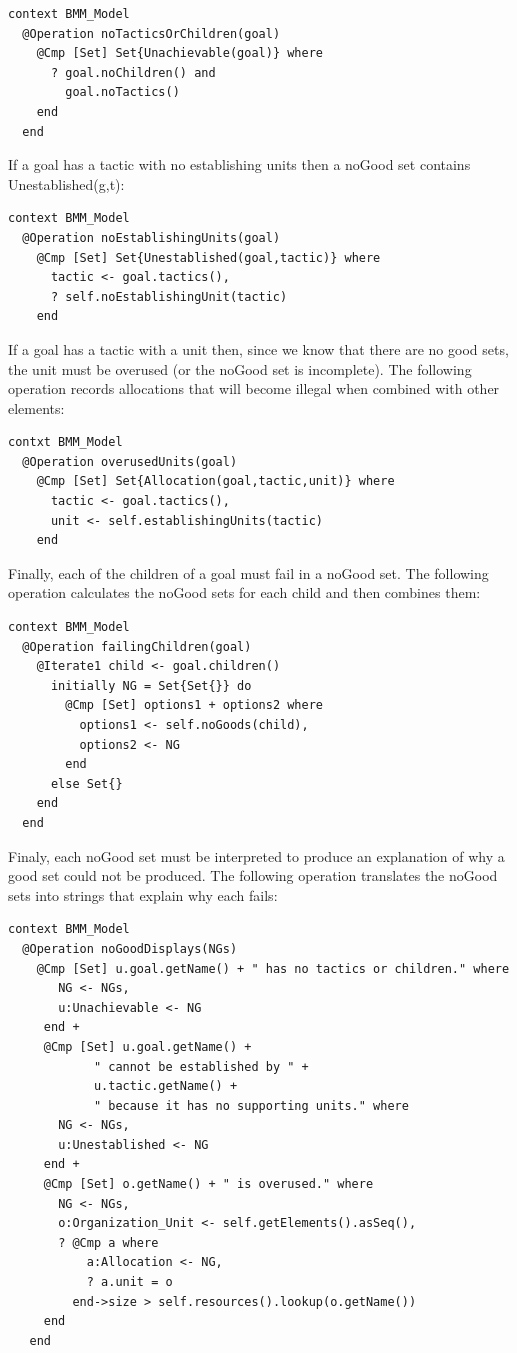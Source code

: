 \begin{lstlisting}
context BMM_Model
  @Operation noTacticsOrChildren(goal)
    @Cmp [Set] Set{Unachievable(goal)} where
      ? goal.noChildren() and 
        goal.noTactics() 
    end
  end
\end{lstlisting}If a goal has a tactic with no establishing units then a noGood set
contains Unestablished(g,t):

\begin{lstlisting}
context BMM_Model
  @Operation noEstablishingUnits(goal)
    @Cmp [Set] Set{Unestablished(goal,tactic)} where
      tactic <- goal.tactics(), 
      ? self.noEstablishingUnit(tactic)
    end 
\end{lstlisting}If a goal has a tactic with a unit then, since we know that there
are no good sets, the unit must be overused (or the noGood set is
incomplete). The following operation records allocations that will
become illegal when combined with other elements:

\begin{lstlisting}
contxt BMM_Model
  @Operation overusedUnits(goal)
    @Cmp [Set] Set{Allocation(goal,tactic,unit)} where
      tactic <- goal.tactics(), 
      unit <- self.establishingUnits(tactic)
    end
\end{lstlisting}Finally, each of the children of a goal must fail in a noGood set.
The following operation calculates the noGood sets for each child
and then combines them:

\begin{lstlisting}
context BMM_Model
  @Operation failingChildren(goal)    
    @Iterate1 child <- goal.children() 
      initially NG = Set{Set{}} do
        @Cmp [Set] options1 + options2 where
          options1 <- self.noGoods(child),
          options2 <- NG
        end
      else Set{}
    end
  end
\end{lstlisting}Finaly, each noGood set must be interpreted to produce an explanation
of why a good set could not be produced. The following operation translates
the noGood sets into strings that explain why each fails:

\begin{lstlisting}
context BMM_Model
  @Operation noGoodDisplays(NGs)
    @Cmp [Set] u.goal.getName() + " has no tactics or children." where 
       NG <- NGs,
       u:Unachievable <- NG
     end +
     @Cmp [Set] u.goal.getName() + 
            " cannot be established by " + 
            u.tactic.getName() + 
            " because it has no supporting units." where 
       NG <- NGs,
       u:Unestablished <- NG 
     end +
     @Cmp [Set] o.getName() + " is overused." where 
       NG <- NGs,
       o:Organization_Unit <- self.getElements().asSeq(), 
       ? @Cmp a where 
           a:Allocation <- NG, 
           ? a.unit = o
         end->size > self.resources().lookup(o.getName()) 
     end
   end
\end{lstlisting}